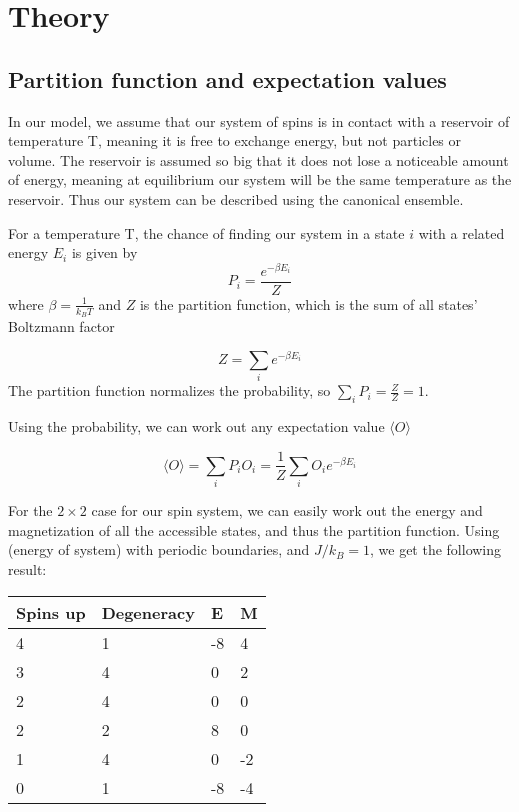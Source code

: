\section{Theory}\label{sec:Theory}
\subsection{Partition function and expectation values}
In our model, we assume that our system of spins is in contact with a reservoir of temperature T, meaning it is free to exchange energy, but not particles or volume. The reservoir is assumed so big that it does not lose a noticeable amount of energy, meaning at equilibrium our system will be the same temperature as the reservoir. Thus our system can be described using the canonical ensemble. 

For a temperature T, the chance of finding our system in a state $i$ with a related energy $E_i$ is given by
\begin{equation*}
    P_i = \frac{e^{-\beta E_i}}{Z}
\end{equation*}
where $\beta = \frac{1}{k_BT}$ and $Z$ is the partition function, which is the sum of all states' Boltzmann factor

\begin{equation}\label{eq:partition}
    Z = \sum_i e^{-\beta E_i}
\end{equation}
The partition function normalizes the probability, so $\sum_i P_i = \frac{Z}{Z} = 1$.

Using the probability, we can work out any expectation value $\langle O \rangle$

\begin{equation}\label{eq:expectation}
    \langle O \rangle = \sum_i P_i O_i = \frac{1}{Z}\sum_i O_i e^{-\beta E_i}
\end{equation}

For the $2\times2$ case for our spin system, we can easily work out the energy and magnetization of all the accessible states, and thus the partition function. Using (energy of system) with periodic boundaries, and $J/k_B=1$, we get the following result: 

\begin{table}[H]\label{tb:tabulated states}
\begin{tabular}{|l|l|l|l|}
\hline
 Spins up&  Degeneracy&  E&  M\\ \hline
 4&  1&  -8&  4\\ \hline
 3&  4&  0&  2\\ \hline
 2&  4&  0&  0\\ \hline
 2&  2&  8&  0\\ \hline
 1&  4&  0&  -2\\ \hline
 0&  1&  -8& -4\\ \hline
\end{tabular}
\end{table}

